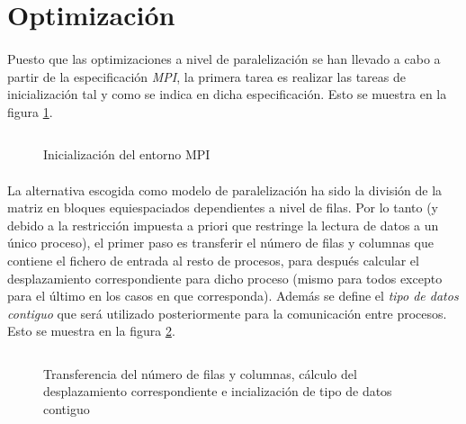\documentclass[10pt, a4paper,spanish]{article}
\begin{document}
		\paragraph{}
		\cite{subject:cp}

	\section{Optimización}

		\paragraph{}
		Puesto que las optimizaciones a nivel de paralelización se han llevado a cabo a partir de la especificación \emph{MPI}, la primera tarea es realizar las tareas de inicialización tal y como se indica en dicha especificación. Esto se muestra en la figura \ref{code:init}.

		\begin{figure}[h]
			\centering
			\inputminted{c}{./code/init.c}
			\caption{Inicialización del entorno MPI}
			\label{code:init}
		\end{figure}

		\paragraph{}
		La alternativa escogida como modelo de paralelización ha sido la división de la matriz en bloques equiespaciados dependientes a nivel de filas. Por lo tanto (y debido a la restricción impuesta a priori que restringe la lectura de datos a un único proceso), el primer paso es transferir el número de filas y columnas que contiene el fichero de entrada al resto de procesos, para después calcular el desplazamiento correspondiente para dicho proceso (mismo para todos excepto para el último en los casos en que corresponda). Además se define el \emph{tipo de datos contiguo} que será utilizado posteriormente para la comunicación entre procesos. Esto se muestra en la figura \ref{code:op1}.

		\begin{figure}[h]
			\centering
			\inputminted{c}{./code/op1.c}
			\caption{Transferencia del número de filas y columnas, cálculo del desplazamiento correspondiente e incialización de tipo de datos contiguo}
			\label{code:op1}
		\end{figure}
\end{document}
